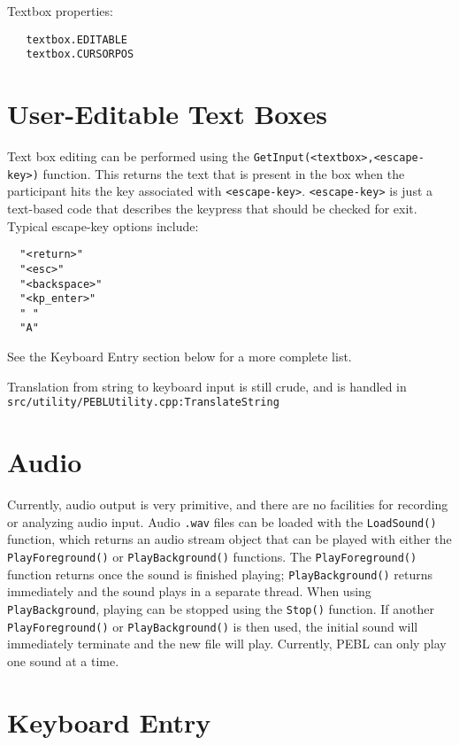 Textbox properties:
\begin{verbatim}
   textbox.EDITABLE
   textbox.CURSORPOS 
\end{verbatim}
 


\section{User-Editable Text Boxes}

Text box editing can be performed using the \verb+GetInput(<textbox>,<escape-key>)+ function.  This returns the text that is present in the box when the participant hits the key associated with \verb+<escape-key>+.  
\verb+<escape-key>+ is just a text-based code that describes the keypress 
that should be checked for exit. Typical escape-key options include:
\begin{verbatim}
  "<return>"
  "<esc>"
  "<backspace>"
  "<kp_enter>"
  " "
  "A"
\end{verbatim}
 
See the Keyboard Entry section below for a more complete list.

Translation from string to keyboard input is still crude, 
and is handled in \texttt{src/utility/PEBLUtility.cpp:TranslateString} 


\section{Audio}

Currently, audio output is very primitive, and there are no facilities for recording or analyzing audio input. Audio \texttt{.wav} files can be loaded with the \texttt{LoadSound()} function, which returns an audio stream object that can be played  with either the \texttt{PlayForeground()} or \texttt{PlayBackground()} functions.  
The \texttt{PlayForeground()} function returns once the sound is finished playing; \texttt{PlayBackground()} returns immediately and the sound plays in a separate thread.  When using \texttt{PlayBackground}, playing can be stopped using the \texttt{Stop()} function.  If another \texttt{PlayForeground()} or \texttt{PlayBackground()} is then used,
the initial sound will immediately terminate and the new file will play. Currently, PEBL can only play one sound at a time.


\section{Keyboard Entry}

